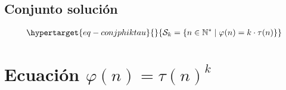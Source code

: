 \documentclass[
  letterpaper,
  DIV=11,
  numbers=noendperiod]{scrreprt}
\begin{document}
\hypertarget{conjunto-soluciuxf3n}{%
\subsection{Conjunto solución}\label{conjunto-soluciuxf3n}}

\begin{equation}\protect\hypertarget{eq-conjphiktau}{}{
\begin{multline}
\mathcal{S}_{k} = \{n \in \mathbb{N^*} \mid \varphi(n)= k \cdot \tau(n)\}
\end{multline}
}\label{eq-conjphiktau}\end{equation}

\hypertarget{ecuaciuxf3n-varphin-taunk}{%
\section{\texorpdfstring{Ecuación
\(\varphi(n) = {\tau(n)}^{k}\)}{Ecuación \textbackslash varphi(n) = \{\textbackslash tau(n)\}\^{}\{k\}}}\label{ecuaciuxf3n-varphin-taunk}}
\end{document}
